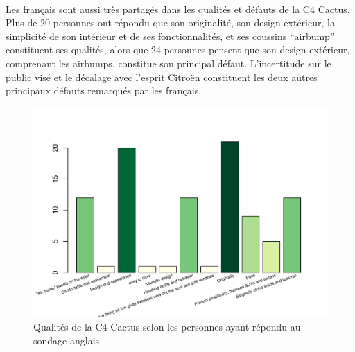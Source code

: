 \documentclass[12pt]{article}\usepackage[]{graphicx}\usepackage[]{color}
\makeatletter
\def\maxwidth{ %
  \ifdim\Gin@nat@width>\linewidth
    \linewidth
  \else
    \Gin@nat@width
  \fi
}
\newenvironment{knitrout}{}{} %
\makeatother
\begin{document}
\paragraph{} Les français sont aussi très partagés dans les qualités et défauts
de la C4 Cactus. Plus de 20 personnes ont répondu que son originalité, son
design extérieur, la simplicité de son intérieur et de ses fonctionnalités, et
ses coussins ``airbump'' constituent ses qualités, alors que 24 personnes
pensent que son design extérieur, comprenant les airbumps, constitue son
principal défaut. L'incertitude sur le public visé et le décalage avec l'esprit
Citroën constituent les deux autres principaux défauts remarqués par les
français.

\begin{knitrout}
\color{fgcolor}\begin{figure}[H]
\includegraphics[width=\maxwidth]{figure/qualities_en-1} \caption[Qualités de la C4 Cactus selon les personnes ayant répondu au sondage anglais]{Qualités de la C4 Cactus selon les personnes ayant répondu au sondage anglais}\label{fig:qualities en}
\end{figure}


\end{knitrout}
\end{document}
